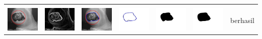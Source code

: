 \begin{table}[H]
\begin{tabular}{|m{0.7in}|m{0.7in}|m{0.7in}|m{0.7in}|m{0.7in}|m{0.7in}|m{0.7in}|}
		&  &  & & & &  \\
		\includegraphics[width=0.7in]{dataset/dataset_3/luka_hitam/ready/37_interp_init.jpg}&
		\includegraphics[width=0.7in]{dataset/dataset_3/luka_hitam/ready/37_interp_ext.jpg}&
		\includegraphics[width=0.7in]{dataset/dataset_3/luka_hitam/ready/37_interp_result.jpg}&
		\includegraphics[width=0.7in]{dataset/dataset_3/luka_hitam/ready/37_gt_r.jpg}&
		\includegraphics[width=0.7in]{dataset/dataset_3/luka_hitam/ready/37_r.jpg}&
		\includegraphics[width=0.7in]{dataset/dataset_3/luka_hitam/ready/37_interp_r.jpg}&
		berhasil\\
		\hline
		

\end{tabular}
\end{table}
